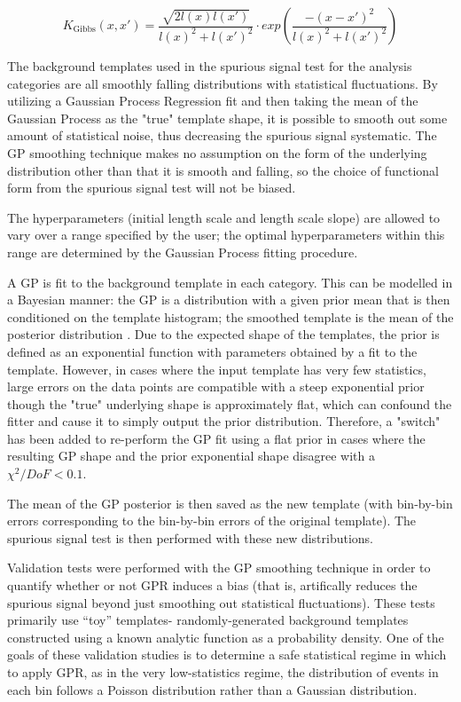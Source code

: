 \begin{equation}
K_\text{Gibbs}(x, x') = \frac{\sqrt{2l(x)l(x')}}{l(x)^2 + l(x')^2 } \cdot exp\left( \frac{-(x-x')^2}{l(x)^2 + l(x')^2} \right)
\end{equation}


The background templates used in the spurious signal test for the analysis categories are all smoothly falling distributions with statistical fluctuations. By utilizing a Gaussian Process Regression fit and then taking the mean of the Gaussian Process as the "true" template shape, it is possible to smooth out some amount of statistical noise, thus decreasing the spurious signal systematic. The GP smoothing technique makes no assumption on the form of the underlying distribution other than that it is smooth and falling, so the choice of functional form from the spurious signal test will not be biased.

The hyperparameters (initial length scale and length scale slope) are allowed to vary over a range specified by the user; the optimal hyperparameters within this range are determined by the Gaussian Process fitting procedure.

A GP is fit to the background template in each category. This can be modelled in a Bayesian manner: the GP is a distribution with a given prior mean that is then conditioned on the template histogram; the smoothed template is the mean of the posterior distribution \cite{GPprior}. Due to the expected shape of the templates, the prior is defined as an exponential function with parameters obtained by a fit to the template. However, in cases where the input template has very few statistics, large errors on the data points are compatible with a steep exponential prior though the "true" underlying shape is approximately flat, which can confound the fitter and cause it to simply output the prior distribution. Therefore, a "switch" has been added to re-perform the GP fit using a flat prior in cases where the resulting GP shape and the prior exponential shape disagree with a $\chi^2/DoF < 0.1$.

The mean of the GP posterior is then saved as the new template (with bin-by-bin errors corresponding to the bin-by-bin errors of the original template). The spurious signal test is then performed with these new distributions.

Validation tests were performed with the GP smoothing technique in order to quantify whether or not GPR induces a bias (that is, artifically reduces the spurious signal beyond just smoothing out statistical fluctuations). These tests primarily use “toy” templates- randomly-generated background templates constructed using a known analytic function as a probability density. One of the goals of these validation studies is to determine a safe statistical regime in which to apply GPR, as in the very low-statistics regime, the distribution of events in each bin follows a Poisson distribution rather than a Gaussian distribution.

